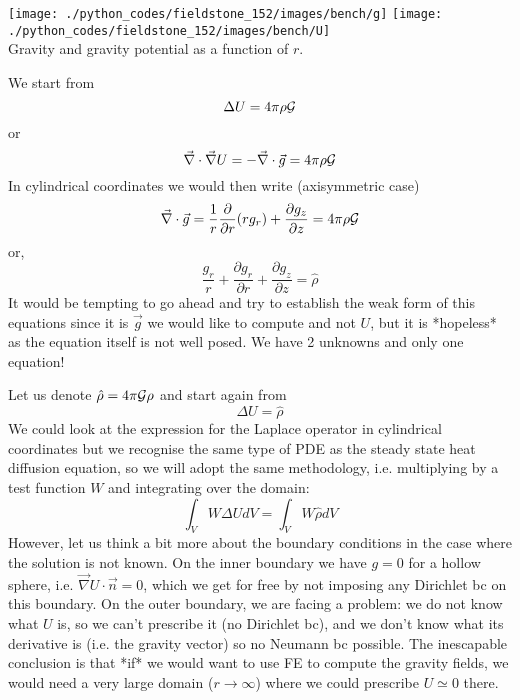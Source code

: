 \begin{center}
\texttt{[image: ./python\_codes/fieldstone\_152/images/bench/g]}
\texttt{[image: ./python\_codes/fieldstone\_152/images/bench/U]}\\
{\captionfont Gravity and gravity potential as a function of $r$.}
\end{center}


We start from 
\[
\Delta U = 4 \pi \rho {\cal G}
\]
or 
\[
\vec\nabla \cdot \vec\nabla  U = -\vec\nabla \cdot \vec{g} = 4 \pi \rho {\cal G}
\]
In cylindrical coordinates we would then write (axisymmetric case)
\[
\vec\nabla\cdot \vec{g} 
= \frac{1}{r} \frac{\partial }{\partial r} (r g_r) 
+\frac{\partial g_z}{\partial z}  = 4\pi \rho {\cal G}
\]
or, 
\[
\frac{g_r}{r} + \frac{\partial g_r}{\partial r} 
+\frac{\partial g_z}{\partial z}  = \hat{\rho}
\]
It would be tempting to go ahead and try to establish the 
weak form of this equations since it is $\vec{g}$ we would 
like to compute and not $U$, but it is *hopeless* as the equation 
itself is not well posed. We have 2 unknowns and only one equation!

Let us denote $\hat{\rho}=4\pi {\cal G} \rho$ and start again from 
\[
\Delta U = \hat{\rho}
\]
We could look at the expression for the Laplace operator
in cylindrical coordinates but we recognise the same type of 
PDE as the steady state heat diffusion equation, so we
will adopt the same methodology, i.e. multiplying by a test function
$W$ and integrating over the domain:
\[
\int_V W \Delta U dV = \int_V W \hat{\rho} dV
\]
However, let us think a bit more about the boundary conditions in the 
case where the solution is not known. 
On the inner boundary we have $g=0$ for a hollow sphere, 
i.e. $\vec\nabla U\cdot \vec{n}=0$, 
which we get for free by not imposing any Dirichlet bc on this boundary.
On the outer boundary, we are facing a problem: we do not know what $U$
is, so we can't prescribe it (no Dirichlet bc), and we don't know 
what its derivative is (i.e. the gravity vector) so no Neumann bc possible.
The inescapable conclusion is that *if* we would want to 
use FE to compute the gravity fields, we would need a very large domain 
($r\rightarrow \infty$) where we could prescribe $U\simeq 0$ there.













\newpage
